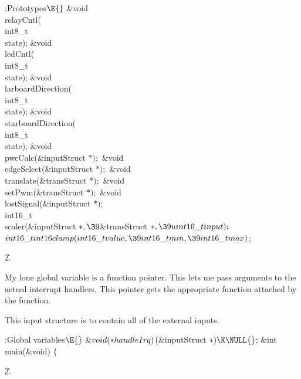 \B{}:Prototypes\X${}\E{}$\6
\&{void} \\{relayCntl}(\\{int8\_t}\\{state});\6
\&{void} \\{ledCntl}(\\{int8\_t}\\{state});\6
\&{void} \\{larboardDirection}(\\{int8\_t}\\{state});\6
\&{void} \\{starboardDirection}(\\{int8\_t}\\{state});\6
\&{void} \\{pwcCalc}(\&{inputStruct} ${}{*});{}$\6
\&{void} \\{edgeSelect}(\&{inputStruct} ${}{*});{}$\6
\&{void} \\{translate}(\&{transStruct} ${}{*});{}$\6
\&{void} \\{setPwm}(\&{transStruct} ${}{*});{}$\6
\&{void} \\{lostSignal}(\&{inputStruct} ${}{*});{}$\7
\\{int16\_t}\\{scaler}(\&{inputStruct} ${}{*},\39{}$\&{transStruct} ${}{*},\39%
\\{uint16\_t}\\{input});{}$\6
${}\\{int16\_t}\\{int16clamp}(\\{int16\_t}\\{value},\39\\{int16\_t}\\{min},\39%
\\{int16\_t}\\{max}){}$;\par
\U2.\fi

My lone global variable is a function pointer.
This lets me pass arguments to the actual interrupt handlers.
This pointer gets the appropriate function attached by the 
function.

This input structure is to contain all of the external inputs.

\Y\B\4:Global variables\X${}\E{}$\6
$\&{void}({*}\\{handleIrq}){}$(\&{inputStruct} ${}{*})\K\NULL{}$;\7
\&{int} \\{main}(\&{void})\1\1\7
$\{{}$\Y\par
\U2.\fi

